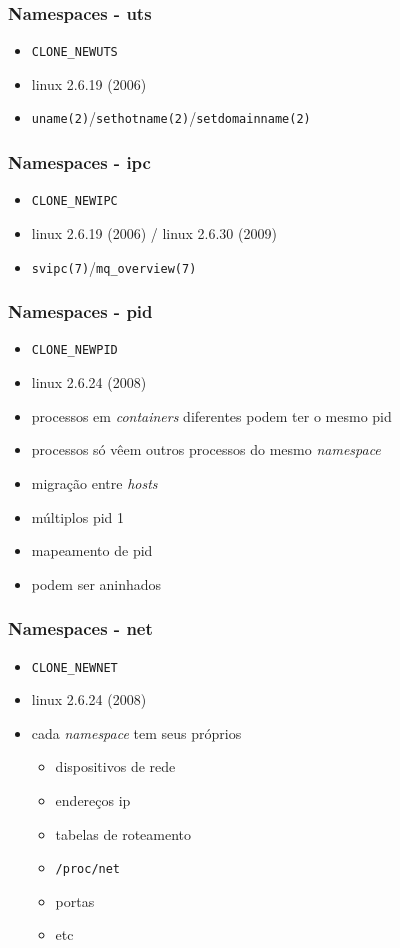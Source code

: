 \documentclass{beamer}
\begin{document}
\begin{frame}
    \frametitle{Namespaces - uts}
    \begin{itemize}
        \item \texttt{CLONE\_NEWUTS}
        \item linux 2.6.19 (2006)
        \item \texttt{uname(2)}/\texttt{sethotname(2)}/\texttt{setdomainname(2)}
    \end{itemize}
\end{frame}

\begin{frame}
    \frametitle{Namespaces - ipc}
    \begin{itemize}
        \item \texttt{CLONE\_NEWIPC}
        \item linux 2.6.19 (2006) / linux 2.6.30 (2009)
        \item \texttt{svipc(7)}/\texttt{mq\_overview(7)}
    \end{itemize}
\end{frame}

\begin{frame}
    \frametitle{Namespaces - pid}
    \begin{itemize}
        \item \texttt{CLONE\_NEWPID}
        \item linux 2.6.24 (2008)
        \item processos em \textit{containers} diferentes podem ter o mesmo pid
        \item processos só vêem outros processos do mesmo \textit{namespace}
        \item migração entre \textit{hosts}
        \item múltiplos pid 1
        \item mapeamento de pid
        \item podem ser aninhados
    \end{itemize}
\end{frame}

\begin{frame}
    \frametitle{Namespaces - net}
    \begin{itemize}
        \item \texttt{CLONE\_NEWNET}
        \item linux 2.6.24 (2008)
        \item cada \textit{namespace} tem seus próprios
            \begin{itemize}
                \item dispositivos de rede
                \item endereços ip
                \item tabelas de roteamento
                \item \texttt{/proc/net}
                \item portas
                \item etc
            \end{itemize}
    \end{itemize}
\end{frame}
\end{document}
